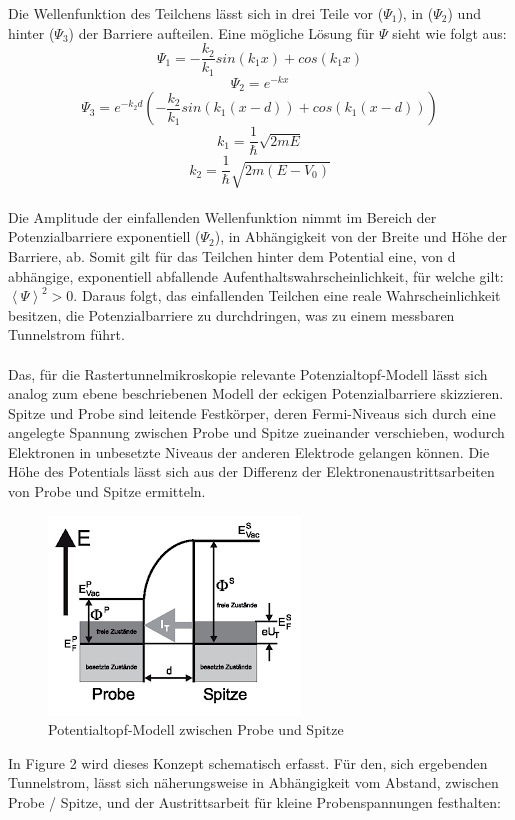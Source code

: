 \documentclass[10pt,a4paper]{article}
\begin{document}
Die Wellenfunktion des Teilchens lässt sich in drei Teile vor ($\Psi_{1}$), in ($\Psi_{2}$) und hinter ($\Psi_{3}$) der Barriere aufteilen. Eine mögliche Lösung für $\Psi$ sieht wie folgt aus:\\
$$\Psi_{1}= -\frac{k_{2}}{k_{1}}sin(k_{1}x) + cos(k_{1}x)$$ 
$$\Psi_{2}= e^{-kx}$$
$$\Psi_{3}= e^{-k_{2}d}(-\frac{k_{2}}{k_{1}}sin(k_{1}(x-d)) + cos(k_{1}(x-d)))$$
$$ k_{1} = \frac{1}{\hbar}\sqrt{2mE} $$
$$k_{2} = \frac{1}{\hbar}\sqrt{2m(E-V_{0})}$$
\\Die Amplitude der einfallenden Wellenfunktion nimmt im Bereich der Potenzialbarriere exponentiell ($\Psi_{2}$), in Abhängigkeit von der Breite und Höhe der Barriere, ab. Somit gilt für das Teilchen hinter dem Potential eine, von d abhängige, exponentiell abfallende Aufenthaltswahrscheinlichkeit, für welche gilt: $\left \langle \Psi  \right \rangle^{2} > 0$. Daraus folgt, das einfallenden Teilchen eine reale Wahrscheinlichkeit besitzen, die Potenzialbarriere zu durchdringen, was zu einem messbaren Tunnelstrom führt. \\ \\Das, für die Rastertunnelmikroskopie relevante Potenzialtopf-Modell lässt sich analog zum ebene beschriebenen Modell der eckigen Potenzialbarriere skizzieren. Spitze und Probe sind leitende Festkörper, deren Fermi-Niveaus sich durch eine angelegte Spannung zwischen Probe und Spitze zueinander verschieben, wodurch Elektronen in unbesetzte Niveaus der anderen Elektrode gelangen können. Die Höhe des Potentials lässt sich aus der Differenz der Elektronenaustrittsarbeiten von Probe und Spitze ermitteln.
\begin{figure}[h]
	\includegraphics[scale = 1.2]{potentialtopf.png}
	\centering
	\caption{Potentialtopf-Modell zwischen Probe und Spitze}
	\label{diagramm_aufspaltung}
\end{figure} 
In Figure 2 wird dieses Konzept schematisch erfasst. Für den, sich ergebenden Tunnelstrom, lässt sich näherungsweise in Abhängigkeit vom Abstand, zwischen Probe / Spitze, und der Austrittsarbeit für kleine Probenspannungen festhalten: 
\end{document}
